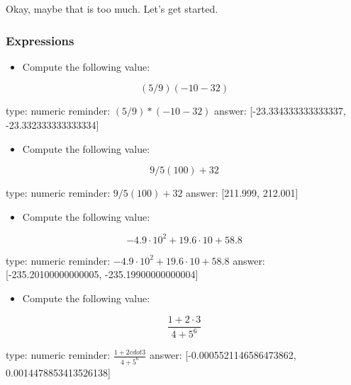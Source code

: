 \documentclass[12pt]{article}
\begin{document}
Okay, maybe that is too much. Let's get started.

\subsubsection{Expressions}

\begin{itemize}
\itemsep1pt\parskip0pt
\item
  Compute the following value:
\end{itemize}

\[
(5/9)(-10 - 32)
\]

\begin{answer}
    type: numeric
    reminder: \( (5/9) * (-10 - 32) \)
    answer: [-23.334333333333337, -23.332333333333334]

\end{answer}

\begin{itemize}
\itemsep1pt\parskip0pt
\item
  Compute the following value:
\end{itemize}

\[
9/5(100) + 32
\]

\begin{answer}
    type: numeric
    reminder: \( 9/5(100) + 32 \)
    answer: [211.999, 212.001]

\end{answer}

\begin{itemize}
\itemsep1pt\parskip0pt
\item
  Compute the following value:
\end{itemize}

\[
-4.9\cdot 10^2 + 19.6\cdot 10 + 58.8 
\]

\begin{answer}
    type: numeric
    reminder: \( -4.9\cdot 10^2 + 19.6\cdot 10 + 58.8 \)
    answer: [-235.20100000000005, -235.19900000000004]

\end{answer}

\begin{itemize}
\itemsep1pt\parskip0pt
\item
  Compute the following value:
\end{itemize}

\[
\frac{1 + 2\cdot 3}{4 + 5^6}
\]

\begin{answer}
    type: numeric
    reminder: \( \frac{1 + 2cdot 3}{4 + 5^6} \)
    answer: [-0.0005521146586473862, 0.0014478853413526138]

\end{answer}
\end{document}
